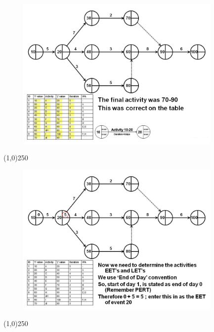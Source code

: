 \begin{frame}
\begin{figure}
	\centering
		\includegraphics[width = 10.0cm]{oldnotes/Slide101.jpg}
\end{figure}
\end{frame}
\begin{center}\line(1,0){250}\end{center}


\begin{frame}
\begin{figure}
	\centering
		\includegraphics[width = 10.0cm]{oldnotes/Slide102.jpg}
\end{figure}
\end{frame}
\begin{center}\line(1,0){250}\end{center}


